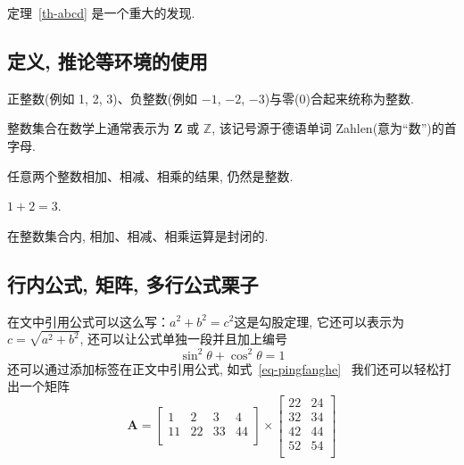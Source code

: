 \documentclass[forprint]{YAUthesis}
\begin{document}
定理~\ref{th-abcd} 是一个重大的发现.

\subsection{定义, 推论等环境的使用}
\begin{definition}[整数]
 正整数(例如 1, 2, 3)、负整数(例如 ${−1}$, $−2$, $−3$)与零(0)合起来统称为{\heiti 整数}.
\end{definition}

\begin{remark}
  整数集合在数学上通常表示为 $\mathbf{Z}$ 或 $\mathbb{Z}$, 该记号源于德语单词 Zahlen(意为``数'')的首字母.
\end{remark}

\begin{proposition}
任意两个整数相加、相减、相乘的结果, 仍然是整数.
\end{proposition}

\begin{example}
  $1+2=3$.
\end{example}

\begin{corollary}
   在整数集合内, 相加、相减、相乘运算是封闭的.
\end{corollary}

\subsection{行内公式, 矩阵, 多行公式栗子}
在文中引用公式可以这么写：$a^2+b^2=c^2$这是勾股定理, 它还可以表示为$c=\sqrt{a^2+b^2}$, 还可以让公式单独一段并且加上编号
\begin{equation}\label{eq-pingfanghe}
\sin^2{\theta}+\cos^2{\theta}=1 
\end{equation}
还可以通过添加标签在正文中引用公式, 如式~\eqref{eq-pingfanghe}~
我们还可以轻松打出一个矩阵
\begin{equation}
\bm{A}=\begin{bmatrix} %
1&2&3&4\\
11&22&33&44\\
\end{bmatrix}
\times\begin{bmatrix}
22&24\\
32&34\\
42&44\\
52&54\\
\end{bmatrix}
\end{equation}
\end{document}
